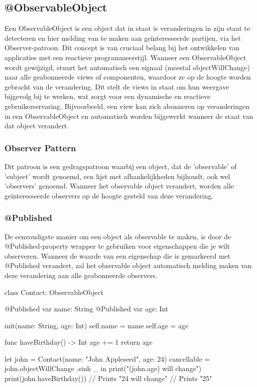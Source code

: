 \subsection{@ObservableObject}
\autocite{AppleObservableObject} Een ObservableObject is een object dat in staat is veranderingen in zijn staat te detecteren en hier melding van te maken aan geïnteresseerde partijen, via het Observer-patroon. Dit concept is van cruciaal belang bij het ontwikkelen van applicaties met een reactieve programmeerstijl. Wanneer een ObservableObject wordt gewijzigd, stuurt het automatisch een signaal (meestal objectWillChange) naar alle geabonneerde views of componenten, waardoor ze op de hoogte worden gebracht van de verandering. Dit stelt de views in staat om hun weergave bijgevolg bij te werken, wat zorgt voor een dynamische en reactieve gebruikerservaring. Bijvoorbeeld, een view kan zich abonneren op veranderingen in een ObservableObject en automatisch worden bijgewerkt wanneer de staat van dat object verandert.

\subsubsection{Observer Pattern}
\autocite{MediumDesignPatterns} Dit patroon is een gedragspatroon waarbij een object, dat de 'observable' of 'subject' wordt genoemd, een lijst met afhankelijkheden bijhoudt, ook wel 'observers' genoemd. Wanneer het observable object verandert, worden alle geïnteresseerde observers op de hoogte gesteld van deze verandering.

\subsubsection{@Published}
\autocite{ApplePublished} De eenvoudigste manier om een object als observable te maken, is door de @Published-property wrapper te gebruiken voor eigenschappen die je wilt observeren. Wanneer de waarde van een eigenschap die is gemarkeerd met @Published verandert, zal het observable object automatisch melding maken van deze verandering aan alle geabonneerde observers.

\begin{swift}[caption=Example of implemented Observable Pattern, label=observable_example]
class Contact: ObservableObject {
    @Published var name: String
    @Published var age: Int
    
    
    init(name: String, age: Int) {
        self.name = name
        self.age = age
    }
    
    
    func haveBirthday() -> Int {
        age += 1
        return age
    }
}


let john = Contact(name: "John Appleseed", age: 24)
cancellable = john.objectWillChange
.sink { _ in
    print("(john.age) will change")
}
print(john.haveBirthday())
// Prints "24 will change"
// Prints "25"
\end{swift}

